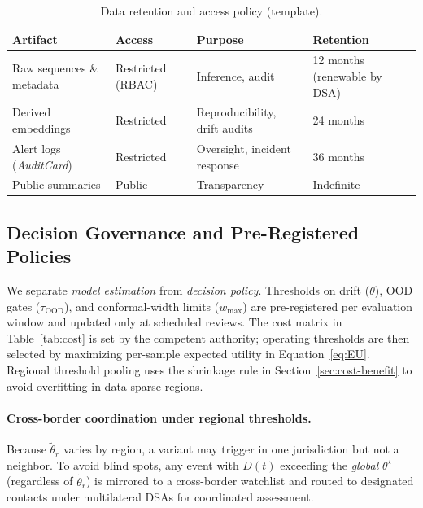 \documentclass[11pt]{article}
\begin{document}
\begin{table}[H]
\centering
\caption{Data retention and access policy (template).}
\label{tab:retention}
\small
\begin{tabularx}{\textwidth}{lXXX}
\toprule
\textbf{Artifact} & \textbf{Access} & \textbf{Purpose} & \textbf{Retention} \\
\midrule
Raw sequences \& metadata & Restricted (RBAC) & Inference, audit & 12 months (renewable by DSA) \\
Derived embeddings & Restricted & Reproducibility, drift audits & 24 months \\
Alert logs (\emph{AuditCard}) & Restricted & Oversight, incident response & 36 months \\
Public summaries & Public & Transparency & Indefinite \\
\bottomrule
\end{tabularx}
\end{table}

\subsection{Decision Governance and Pre-Registered Policies}
\label{sec:policies}
We separate \emph{model estimation} from \emph{decision policy}. Thresholds on drift ($\theta$), OOD gates ($\tau_{\text{OOD}}$), and conformal-width limits ($w_{\max}$) are pre-registered per evaluation window and updated only at scheduled reviews. The cost matrix in Table~\ref{tab:cost} is set by the competent authority; operating thresholds are then selected by maximizing per-sample expected utility in Equation~\eqref{eq:EU}. Regional threshold pooling uses the shrinkage rule in Section~\ref{sec:cost-benefit} to avoid overfitting in data-sparse regions.

\paragraph{Cross-border coordination under regional thresholds.}
Because $\tilde{\theta}_r$ varies by region, a variant may trigger in one jurisdiction but not a neighbor. To avoid blind spots, any event with $D(t)$ exceeding the \emph{global} $\theta^\star$ (regardless of $\tilde{\theta}_r$) is mirrored to a cross-border watchlist and routed to designated contacts under multilateral DSAs for coordinated assessment.
\end{document}
